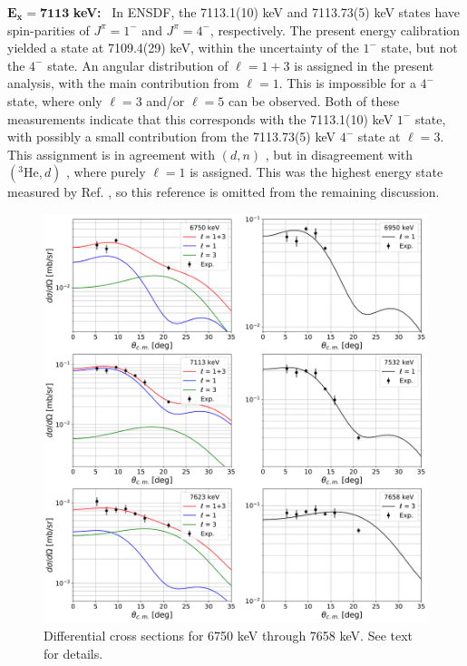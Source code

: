 \emph{$\mathbf{E_{x} = 7113}$} \textbf{keV:} \, 
In ENSDF, the 7113.1(10) keV and 7113.73(5) keV states have spin-parities of $J^{\pi} = 1^{-}$ and $J^{\pi} = 4^{-}$, respectively. The present energy calibration yielded a state at 7109.4(29) keV, within the uncertainty of the $1^{-}$ state, but not the $4^{-}$ state. An angular distribution of $\ell=1+3$ is assigned in the present analysis, with the main contribution from $\ell=1$. This is impossible for a $4^{-}$ state, where only $\ell=3$ and/or $\ell=5$ can be observed. Both of these measurements indicate that this corresponds with the 7113.1(10) keV $1^{-}$ state, with possibly a small contribution from the 7113.73(5) keV $4^{-}$ state at $\ell=3$. This assignment is in agreement with $(d,n)$ \cite{Fuchs1969}, but in disagreement with $(^{3}\mathrm{He},d)$ \cite{Erskine1966,Seth1967,Forster1970,Cage1971}, where purely $\ell=1$ is assigned. This was the highest energy state measured by Ref. \cite{Forster1970}, so this reference is omitted from the remaining discussion.

\begin{figure}[!p]
\centering
\includegraphics[width=6.5in]{Chapter-6/figs/diffcross_6panel_2.png}
\caption{\label{fig:diffcross_6panel_2}Differential cross sections for 6750 keV through 7658 keV. See text for details.}
\end{figure}

